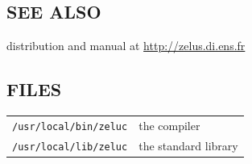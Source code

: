 \documentclass[11pt,titlepage,twoside]{report}
\begin{document}
\subsection*{SEE ALSO}
distribution and manual at \url{http://zelus.di.ens.fr}

\subsection*{FILES}

\begin{tabular}{ll}
{\tt /usr/local/bin/zeluc}           & the compiler
\\
{\tt /usr/local/lib/zeluc} & the standard library
\end{tabular}



\end{document}
